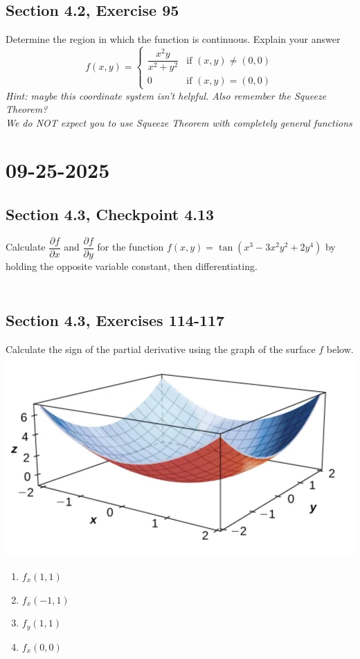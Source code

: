 \documentclass[]{mangos-musings}
\begin{document}
\subsection{Section 4.2, Exercise 95}
Determine the region in which the function is continuous. Explain your answer 
\[f(x, y) = \begin{cases}
  \dfrac{x^2y}{x^2 + y^2} & \text{if } (x,y)\neq(0,0)
  \\ 0 & \text{if }(x, y) = (0, 0)
\end{cases}\]
\textit{Hint: maybe this coordinate system isn't helpful. Also remember the Squeeze Theorem?}
\\ \textit{We do NOT expect you to use Squeeze Theorem with completely general functions}


\newpage
\section{09-25-2025}
\subsection{Section 4.3, Checkpoint 4.13}
Calculate $\dfrac{\partial f}{\partial x}$ and $\dfrac{\partial f}{\partial y}$ for the function $f(x, y) = \tan(x^3 - 3x^2 y^2 + 2y^4)$ by holding the opposite variable constant, then differentiating.
\begin{align*}
  \\ \\ \\
\end{align*}

\subsection{Section 4.3, Exercises 114-117}
Calculate the sign of the partial derivative using the graph of the surface $f$ below.
\\\includegraphics[scale=0.4]{assets/rec10-ex114-117.png}
\begin{enumerate}[start=114]
  \item $f_x(1, 1)$
  \item $f_x(-1, 1)$
  \item $f_y(1, 1)$
  \item $f_x(0, 0)$
\end{enumerate}
\end{document}
